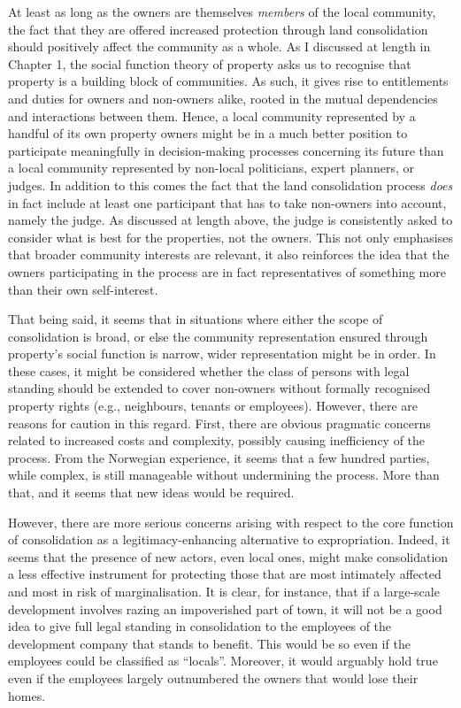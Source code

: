 At least as long as the owners are themselves {\it members} of the local community, the fact that they are offered increased protection through land consolidation should positively affect the community as a whole. As I discussed at length in Chapter 1, the social function theory of property asks us to recognise that property is a building block of communities. As such, it gives rise to entitlements and duties for owners and non-owners alike, rooted in the mutual dependencies and interactions between them. Hence, a local community represented by a handful of its own property owners might be in a much better position to participate meaningfully in decision-making processes concerning its future than a local community represented by non-local politicians, expert planners, or judges. In addition to this comes the fact that the land consolidation process {\it does} in fact include at least one participant that has to take non-owners into account, namely the judge. As discussed at length above, the judge is consistently asked to consider what is best for the properties, not the owners. This not only emphasises that broader community interests are relevant, it also reinforces the idea that the owners participating in the process are in fact representatives of something more than their own self-interest.

That being said, it seems that in situations where either the scope of consolidation is broad, or else the community representation ensured through property's social function is narrow, wider representation might be in order. In these cases, it might be considered whether the class of persons with legal standing should be extended to cover non-owners without formally recognised property rights (e.g., neighbours, tenants or employees). However, there are reasons for caution in this regard. First, there are obvious pragmatic concerns related to increased costs and complexity, possibly causing inefficiency of the process. From the Norwegian experience, it seems that a few hundred parties, while complex, is still manageable without undermining the process. More than that, and it seems that new ideas would be required. 

However, there are more serious concerns arising with respect to the core function of consolidation as a legitimacy-enhancing alternative to expropriation. Indeed, it seems that the presence of new actors, even local ones, might make consolidation a less effective instrument for protecting those that are most intimately affected and most in risk of marginalisation. It is clear, for instance, that if a large-scale development involves razing an impoverished part of town, it will not be a good idea to give full legal standing in consolidation to the employees of the development company that stands to benefit. This would be so even if the employees could be classified as ``locals''. Moreover, it would arguably hold true even if the employees largely outnumbered the owners that would lose their homes. 
 
